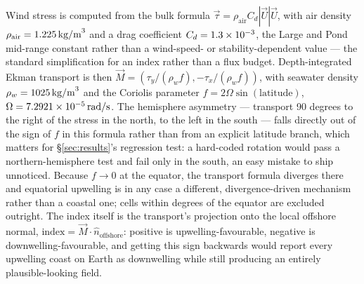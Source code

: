  Wind stress is computed from the bulk
formula $\vec{\tau} = \rho_{\text{air}} C_d |\vec{U}| \vec{U}$, with air
density $\rho_{\text{air}} = 1.225{}\,\text{kg/m}^3$ and a drag
coefficient $C_d = 1.3\times10^{-3}{}$, the Large and Pond mid-range constant
\citep{largepond1981} rather than a wind-speed- or stability-dependent value
--- the standard simplification for an index rather than a flux budget.
Depth-integrated Ekman transport is then $\vec{M} = (\tau_y / (\rho_w f),
-\tau_x / (\rho_w f))$, with seawater density $\rho_w =
1025{}\,\text{kg/m}^3$ and the Coriolis parameter $f = 2\Omega
\sin(\text{latitude})$, $\Omega = 7.2921\times10^{-5}{}\,\text{rad/s}$. The
hemisphere asymmetry --- transport 90 degrees to the right of the stress in
the north, to the left in the south --- falls directly out of the sign of
$f$ in this formula rather than from an explicit latitude branch, which
matters for \S\ref{sec:results}'s regression test: a hard-coded rotation
would pass a northern-hemisphere test and fail only in the south, an easy
mistake to ship unnoticed. Because $f \to 0$ at the equator, the transport
formula diverges there and equatorial upwelling is in any case a different,
divergence-driven mechanism rather than a coastal one; cells within
\EquatorialBandDeg{} degrees of the equator are excluded outright. The index
itself is the transport's projection onto the local offshore normal,
$\text{index} = \vec{M} \cdot \hat{n}_{\text{offshore}}$: positive is
upwelling-favourable, negative is downwelling-favourable, and getting this
sign backwards would report every upwelling coast on Earth as downwelling
while still producing an entirely plausible-looking field.


